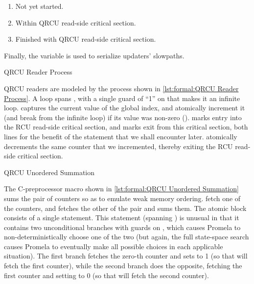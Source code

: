 \begin{enumerate}[label={\arabic*}:,start=0,itemsep=0pt]
\item	Not yet started.
\item	Within QRCU read-side critical section.
\item	Finished with QRCU read-side critical section.
\end{enumerate}

Finally, the  variable is used to serialize updaters' slowpaths.

\begin{listing}

\caption{QRCU Reader Process}
\label{lst:formal:QRCU Reader Process}
\end{listing}

\begin{fcvref}
QRCU readers are modeled by the  process shown in
\cref{lst:formal:QRCU Reader Process}.
A  loop spans ,
with a single guard of ``1''
on  that makes it an infinite loop.
 captures the current value of the global index,
and 
atomically increment it (and break from the infinite loop)
if its value was non-zero ().
 marks entry into the RCU read-side critical section, and
 marks exit from this critical section,
both lines for the benefit of
the  statement that we shall encounter later.
 atomically decrements the same counter that we incremented,
thereby exiting the RCU read-side critical section.
\end{fcvref}

\begin{listing}

\caption{QRCU Unordered Summation}
\label{lst:formal:QRCU Unordered Summation}
\end{listing}

\begin{fcvref}
The C-preprocessor macro shown in
\cref{lst:formal:QRCU Unordered Summation}
sums the pair of counters so as to emulate weak memory ordering.
 fetch one of the counters,
and  fetches the other
of the pair and sums them.
The atomic block consists of a single  statement.
This  statement (spanning ) is unusual in that
it contains two unconditional
branches with guards on , which causes Promela to
non-deterministically choose one of the two (but again, the full
state-space search causes Promela to eventually make all possible
choices in each applicable situation).
The first branch fetches the zero-th counter and sets  to 1 (so
that  will fetch the first counter), while the second
branch does the opposite, fetching the first counter and setting 
to 0 (so that  will fetch the second counter).
\end{fcvref}

